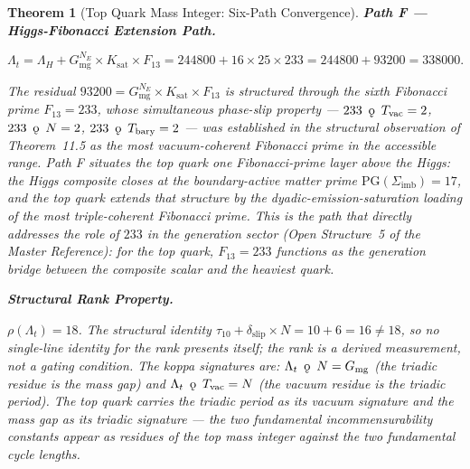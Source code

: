 \documentclass[11pt, letterpaper]{article}
\newcommand{\koppa}{\mathbin{\text{\rm\k{o}}}}
\theoremstyle{definition}
\theoremstyle{plain}
\newtheorem{theorem}{Theorem}[section]
\begin{document}
\begin{theorem}[Top Quark Mass Integer: Six-Path Convergence]
\medskip
\noindent\textbf{Path F — Higgs-Fibonacci Extension Path.}

\begin{equation}
    \Lambda_t = \Lambda_H + G_\mathrm{mg}^{N_E} \times K_\mathrm{sat} \times F_{13}
              = 244800 + 16 \times 25 \times 233 = 244800 + 93200 = 338000.
\end{equation}

The residual $93200 = G_\mathrm{mg}^{N_E} \times K_\mathrm{sat} \times F_{13}$ is
structured through the sixth Fibonacci prime $F_{13} = 233$, whose simultaneous
phase-slip property — $233 \;\mathbin{\koppa}\; T_\mathrm{vac} = 2$,
$233 \;\mathbin{\koppa}\; N = 2$, $233 \;\mathbin{\koppa}\; T_\mathrm{bary} = 2$ — was
established in the structural observation of Theorem~11.5 as the most vacuum-coherent
Fibonacci prime in the accessible range. Path F situates the top quark one Fibonacci-prime
layer above the Higgs: the Higgs composite closes at the boundary-active matter prime
$\mathrm{PG}(\Sigma_\mathrm{imb}) = 17$, and the top quark extends that structure by the
dyadic-emission-saturation loading of the most triple-coherent Fibonacci prime.
This is the path that directly addresses the role of $233$ in the generation sector
(Open Structure~5 of the Master Reference): for the top quark, $F_{13} = 233$ functions
as the generation bridge between the composite scalar and the heaviest quark.

\medskip
\noindent\textbf{Structural Rank Property.}

$\rho(\Lambda_t) = 18$. The structural identity $\tau_{10} + \delta_\mathrm{slip} \times N
= 10 + 6 = 16 \neq 18$, so no single-line identity for the rank presents itself; the
rank is a derived measurement, not a gating condition. The koppa signatures are:
$\Lambda_t \;\mathbin{\koppa}\; N = G_\mathrm{mg}$ (the triadic residue is the mass gap)
and $\Lambda_t \;\mathbin{\koppa}\; T_\mathrm{vac} = N$ (the vacuum residue is the triadic
period). The top quark carries the triadic period as its vacuum signature and the mass
gap as its triadic signature — the two fundamental incommensurability constants appear
as residues of the top mass integer against the two fundamental cycle lengths.
\end{theorem}
\end{document}
